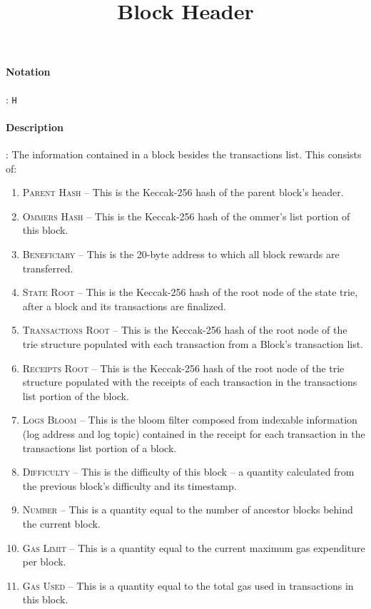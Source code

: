 \documentclass[10pt,a4paper,oneside]{scrartcl}
\author{}
\title{Block Header}
\date{}
\begin{document}
\maketitle
\paragraph{Notation}: \texttt{H} 
\paragraph{Description}: The information contained in a block besides the transactions list. This consists of:

\begin{enumerate}
	\item \textsc{Parent Hash} -- This is the Keccak-256 hash of the parent block's header.
	\item \textsc{Ommers Hash} -- This is the Keccak-256 hash of the ommer's list portion of this block.
	\item \textsc{Beneficiary} -- This is the 20-byte address to which all block rewards are transferred.
	\item \textsc{State Root} -- This is the Keccak-256 hash of the root node of the state trie, after a block and its transactions are finalized.
	\item \textsc{Transactions Root} -- This is the Keccak-256 hash of the root node of the trie structure populated with each transaction from a Block's transaction list.
	\item \textsc{Receipts Root} -- This is the Keccak-256 hash of the root node of the trie structure populated with the receipts of each transaction in the transactions list portion of the block.
	\item \textsc{Logs Bloom} -- This is the bloom filter composed from indexable information (log address and log topic) contained in the receipt for each transaction in the transactions list portion of a block.
	\item \textsc{Difficulty} -- This is the difficulty of this block -- a quantity calculated from the previous block's difficulty and its timestamp.
	\item \textsc{Number} -- This is a quantity equal to the number of ancestor blocks behind the current block.
	\item \textsc{Gas Limit} -- This is a quantity equal to the current maximum gas expenditure per block.
	\item \textsc{Gas Used} -- This is a quantity equal to the total gas used in transactions in this block.

\end{enumerate}
\end{document}
